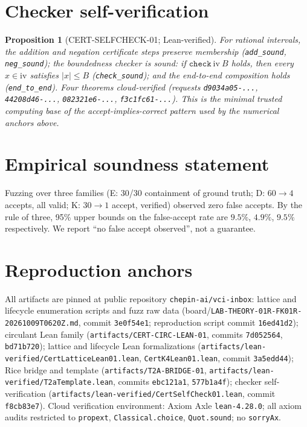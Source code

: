 \documentclass[11pt]{article}
\newtheorem{proposition}[theorem]{Proposition}
\begin{document}
\section{Checker self-verification}
\begin{proposition}[CERT-SELFCHECK-01; Lean-verified]
For rational intervals, the addition and negation certificate steps preserve
membership (\texttt{add\_sound}, \texttt{neg\_sound}); the boundedness
checker is sound: if $\texttt{check}\ \mathrm{iv}\ B$ holds, then every
$x\in\mathrm{iv}$ satisfies $|x|\le B$ (\texttt{check\_sound}); and the
end-to-end composition holds (\texttt{end\_to\_end}). Four theorems
cloud-verified (requests \texttt{d9034a05-...}, \texttt{44208d46-...},
\texttt{082321e6-...}, \texttt{f3c1fc61-...}). This is the minimal trusted
computing base of the accept-implies-correct pattern used by the numerical
anchors above.
\end{proposition}

\section{Empirical soundness statement}
Fuzzing over three families (E: 30/30 containment of ground truth; D:
$60\to4$ accepts, all valid; K: $30\to1$ accept, verified) observed zero
false accepts. By the rule of three, 95\% upper bounds on the false-accept
rate are $9.5\%$, $4.9\%$, $9.5\%$ respectively. We report ``no false accept
observed'', not a guarantee.

\appendix
\section{Reproduction anchors}
All artifacts are pinned at public repository \texttt{chepin-ai/vci-inbox}:
lattice and lifecycle enumeration scripts and fuzz raw data
(board/\texttt{LAB-THEORY-01R-FK01R-20261009T0620Z.md}, commit
\texttt{3e0f54e1}; reproduction script commit \texttt{16ed41d2});
circulant Lean family (\texttt{artifacts/CERT-CIRC-LEAN-01}, commits
\texttt{7d052564}, \texttt{bd71b720}); lattice and lifecycle Lean
formalizations (\texttt{artifacts/lean-verified/CertLatticeLean01.lean},
\texttt{CertK4Lean01.lean}, commit \texttt{3a5edd44}); Rice bridge and
template (\texttt{artifacts/T2A-BRIDGE-01},
\texttt{artifacts/lean-verified/T2aTemplate.lean}, commits \texttt{ebc121a1},
\texttt{577b1a4f}); checker self-verification
(\texttt{artifacts/lean-verified/CertSelfCheck01.lean}, commit
\texttt{f8cb83e7}). Cloud verification environment: Axiom Axle
\texttt{lean-4.28.0}; all axiom audits restricted to \texttt{propext},
\texttt{Classical.choice}, \texttt{Quot.sound}; no \texttt{sorryAx}.
\end{document}
